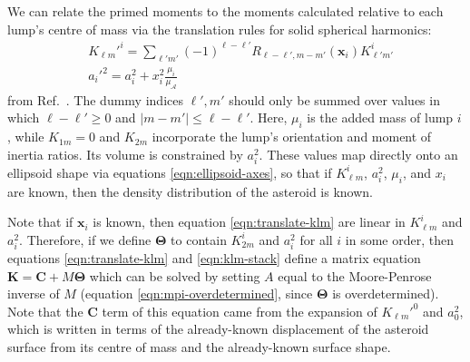 \documentclass[fleqn,usenatbib]{mnras}
\begin{document}
We can relate the primed moments to the moments calculated relative to each lump's centre of mass via the translation rules for solid spherical harmonics:
\begin{equation}
  \begin{split}
  & K_{\ell m}'^i = \sum_{\ell' m'} (-1)^{\ell - \ell'} R_{\ell - \ell', m - m'}(\bm x_i) K_{\ell' m'}^i\\
  & a_i'^2 = a_i^2 + x_i^2 \frac{\mu_i}{\mu_\mathcal{A}}
  \end{split}
  \label{eqn:translate-klm}
\end{equation}
from Ref.~\cite{Gelderen1998TheSO}. The dummy indices $\ell', m'$ should only be summed over values in which $\ell-\ell' \geq 0$ and $|m-m'| \leq \ell - \ell'$. Here, $\mu_i$ is the added mass of lump $i$, while $K_{1m}=0$ and $K_{2m}$ incorporate the lump's orientation and moment of inertia ratios. Its volume is constrained by $a_i^2$. These values map directly onto an ellipsoid shape via equations \ref{eqn:ellipsoid-axes}, so that if $K_{\ell m}^i$, $a_i^2$, $\mu_i$, and $x_i$ are known, then the density distribution of the asteroid is known.

Note that if $\bm x_i$ is known, then equation \ref{eqn:translate-klm} are linear in $K_{\ell m}^i$ and $a_i^2$. Therefore, if we define $\bm \Theta$ to contain $K_{2m}^i$ and $a_i^2$ for all $i$ in some order, then equations \ref{eqn:translate-klm} and \ref{eqn:klm-stack} define a matrix equation $\bm K = \bm C + M \bm \Theta$ which can be solved by setting $A$ equal to the Moore-Penrose inverse of $M$ (equation \ref{eqn:mpi-overdetermined}, since $\bm \Theta$ is overdetermined). Note that the $\bm C$ term of this equation came from the expansion of $K_{\ell m}'^0$ and $a_0^2$, which is written in terms of the already-known displacement of the asteroid surface from its centre of mass and the already-known surface shape.
\end{document}
